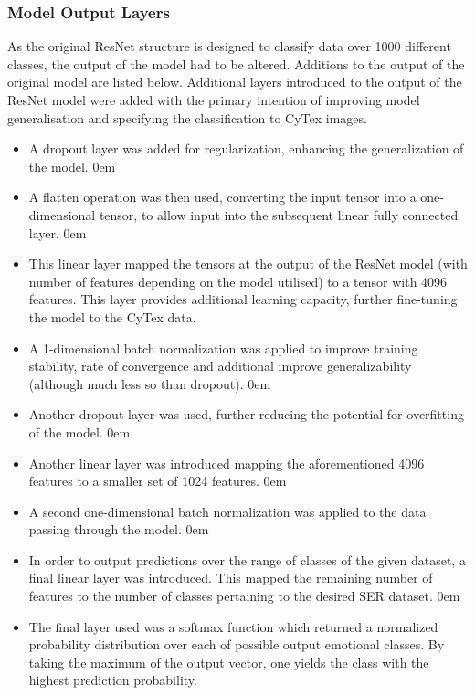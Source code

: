 \subsubsection{Model Output Layers}
As the original ResNet structure is designed to classify data over 1000 different classes, the output of the model had to be altered. Additions to the output of the original model are listed below. Additional layers introduced to the output of the ResNet model were added with the primary intention of improving model generalisation and specifying the classification to CyTex images.
\begin{itemize}
    \item A dropout layer was added for regularization, enhancing the generalization of the model.
    \itemsep0em
    \item A flatten operation was then used, converting the input tensor into a one-dimensional tensor, to allow input into the subsequent linear fully connected layer.
    \itemsep0em
    \item This linear layer mapped the tensors at the output of the ResNet model (with number of features depending on the model utilised) to a tensor with 4096 features. This layer provides additional learning capacity, further fine-tuning the model to the CyTex data.
    \item A 1-dimensional batch normalization was applied to improve training stability, rate of convergence and additional improve generalizability (although much less so than dropout).
    \itemsep0em
    \item Another dropout layer was used, further reducing the potential for overfitting of the model.
    \itemsep0em
    \item Another linear layer was introduced mapping the aforementioned 4096 features to a smaller set of 1024 features.
    \itemsep0em
    \item A second one-dimensional batch normalization was applied to the data passing through the model.
    \itemsep0em
    \item In order to output predictions over the range of classes of the given dataset, a final linear layer was introduced. This mapped the remaining number of features to the number of classes pertaining to the desired SER dataset.
    \itemsep0em
    \item The final layer used was a softmax function which returned a normalized probability distribution over each of possible output emotional classes. By taking the maximum of the output vector, one yields the class with the highest prediction probability.
\end{itemize}


